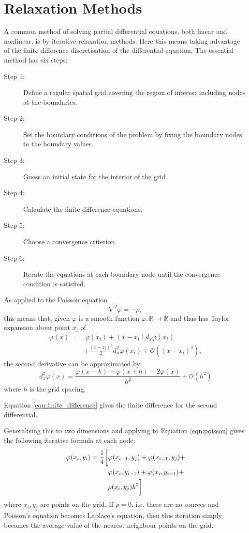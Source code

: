 \section{Relaxation Methods}
\label{sec:relaxation_methods}

A common method of solving partial differential equations, both linear and nonlinear, is by iterative relaxation methods. Here this means taking advantage of the finite difference discretisation of the differential equation. The essential method has six steps:
\begin{description}
    \item[Step 1:] Define a regular spatial grid covering the region of interest including nodes at the boundaries.
    \item[Step 2:] Set the boundary conditions of the problem by fixing the boundary nodes to the boundary values.
    \item[Step 3:] Guess an initial state for the interior of the grid.
    \item[Step 4:] Calculate the finite difference equations.
    \item[Step 5:] Choose a convergence criterion.
    \item[Step 6:] Iterate the equations at each boundary node until the convergence condition is satisfied.
\end{description}

As applied to the Poisson equation
\begin{equation}
    \nabla^2 \varphi = -\rho,
    \label{eqn:poisson}
\end{equation}
this means that, given $\varphi$ is a smooth function $\varphi: \mathbb{R} \rightarrow \mathbb{R}$ and thus has Taylor expansion about point $x_i$ of
\begin{align*}
    \varphi(x) =&~\varphi(x_i) + (x-x_i)d_x\varphi(x_i) \\
                & + \frac{(x-x_i)^2}{2}d_x^2\varphi(x_i) + \mathcal{O}((x-x_i)^3),
\end{align*}
the second derivative can be approximated by
\begin{equation}
    d_x^2\varphi(x) = \frac{\varphi(x-h)+\varphi(x+h)-2\varphi(x)}{h^2} + \mathcal{O}(h^2)
    \label{eqn:finite_difference}
\end{equation}
where $h$ is the grid spacing.

Equation \ref{eqn:finite_difference} gives the finite difference for the second differential.

Generalising this to two dimensions and applying to Equation \ref{eqn:poisson} gives the following iterative formula at each node:
\begin{align}
    \varphi(x_i,y_i) = \frac{1}{4}\bigg[&\varphi(x_{i-1},y_j)+\varphi(x_{i+1},y_j)+ \notag \\
        & \varphi(x_i,y_{i-1})+\varphi(x_i,y_{i+1})+ \label{eqn:iteration} \\
        & \rho(x_i,y_j)h^2\bigg] \notag
\end{align}
where $x_i,y_j$ are points on the grid. If $\rho = 0$, i.e. there are no sources and Poisson's equation becomes Laplace's equation, then this iteration simply becomes the average value of the nearest neighbour points on the grid.

